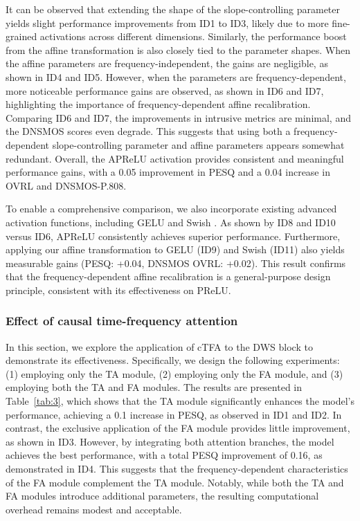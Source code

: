 \documentclass[journal]{IEEEtran}
\newcommand{\rev}[1]{#1}
\begin{document}
It can be observed that extending the shape of the slope-controlling parameter yields slight performance improvements from ID1 to ID3, likely due to more fine-grained activations across different dimensions. Similarly, the performance boost from the affine transformation is also closely tied to the parameter shapes. When the affine parameters are frequency-independent, the gains are negligible, as shown in ID4 and ID5. However, when the parameters are frequency-dependent, more \rev{noticeable} performance gains are observed, as shown in ID6 and ID7\rev{, highlighting the importance of frequency-dependent affine recalibration}. Comparing ID6 and ID7, the improvements in intrusive metrics are minimal, and the DNSMOS scores even degrade. This suggests that using both a frequency-dependent slope-controlling parameter and affine parameters appears somewhat redundant. Overall, the APReLU activation provides \rev{consistent and meaningful} performance gains, with a 0.05 improvement in PESQ and a 0.04 increase in OVRL and DNSMOS-P.808.

\rev{To enable a comprehensive comparison, we also incorporate existing advanced activation functions, including GELU \cite{GELU} and Swish \cite{Swish}. As shown by ID8 and ID10 versus ID6, APReLU consistently achieves superior performance. Furthermore, applying our affine transformation to GELU (ID9) and Swish (ID11) also yields measurable gains (PESQ: +0.04, DNSMOS OVRL: +0.02). This result confirms that the frequency-dependent affine recalibration is a general-purpose design principle, consistent with its effectiveness on PReLU.}

\subsubsection{Effect of causal time-frequency attention}
In this section, we explore the application of cTFA to the DWS block to demonstrate its effectiveness. Specifically, we design the following experiments: (1) employing only the \rev{TA} module, (2) employing only the \rev{FA} module, and (3) employing both the \rev{TA} and \rev{FA} modules. The results are presented in Table~\ref{tab:3}, which shows that the TA module significantly enhances the model's performance, achieving a 0.1 increase in PESQ, as observed in ID1 and ID2. In contrast, the exclusive application of the FA module provides little improvement, as shown in ID3. However, by integrating both attention branches, the model achieves the best performance, with a total PESQ improvement of \rev{0.16}, as demonstrated in ID4. This suggests that the frequency-dependent characteristics of the \rev{FA} module complement the \rev{TA} module. Notably, while both the \rev{TA} and \rev{FA} modules introduce additional parameters, the resulting computational overhead remains modest and acceptable.
\end{document}
